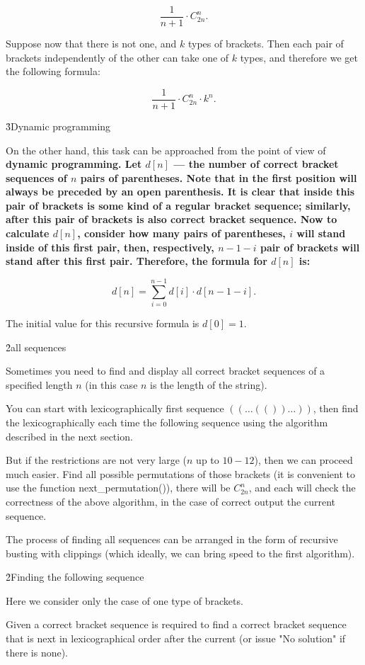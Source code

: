 $$ \frac{1}{n+1} \cdot C^n_{2n}. $$

Suppose now that there is not one, and $k$ types of brackets. Then each pair of brackets independently of the other can take one of $k$ types, and therefore we get the following formula:

$$ \frac{1}{n+1} \cdot C^n_{2n} \cdot k^n. $$

\h3{Dynamic programming}

On the other hand, this task can be approached from the point of view of \bf{dynamic programming}. Let $d[n]$ --- the number of correct bracket sequences of $n$ pairs of parentheses. Note that in the first position will always be preceded by an open parenthesis. It is clear that inside this pair of brackets is some kind of a regular bracket sequence; similarly, after this pair of brackets is also correct bracket sequence. Now to calculate $d[n]$, consider how many pairs of parentheses, $i$ will stand inside of this first pair, then, respectively, $n-1-i$ pair of brackets will stand after this first pair. Therefore, the formula for $d[n]$ is:

$$ d[n] = \sum_{i=0}^{n-1} d[i] \cdot d[n-1-i]. $$

The initial value for this recursive formula is $d[0] = 1$.


\h2{all sequences}

Sometimes you need to find and display all correct bracket sequences of a specified length $n$ (in this case $n$ is the length of the string).

You can start with lexicographically first sequence $((\ldots(())\ldots))$, then find the lexicographically each time the following sequence using the algorithm described in the next section.

But if the restrictions are not very large ($n$ up to $10-12$), then we can proceed much easier. Find all possible permutations of those brackets (it is convenient to use the function next_permutation()), there will be $C_{2n}^n$, and each will check the correctness of the above algorithm, in the case of correct output the current sequence.

The process of finding all sequences can be arranged in the form of recursive busting with clippings (which ideally, we can bring speed to the first algorithm).


\h2{Finding the following sequence}

Here we consider only the case of one type of brackets.

Given a correct bracket sequence is required to find a correct bracket sequence that is next in lexicographical order after the current (or issue "No solution" if there is none).

